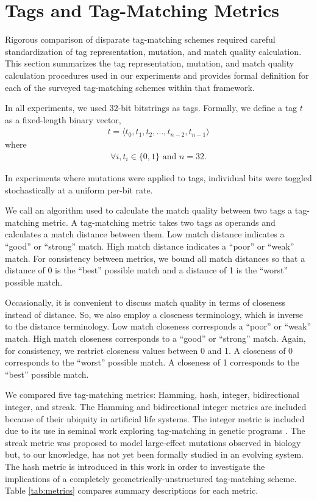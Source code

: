 \section{Tags and Tag-Matching Metrics}

Rigorous comparison of disparate tag-matching schemes required careful standardization of tag representation, mutation, and match quality calculation.
This section summarizes the tag representation, mutation, and match quality calculation procedures used in our experiments and provides formal definition for each of the surveyed tag-matching schemes within that framework.

In all experiments, we used 32-bit bitstrings as tags.
Formally, we define a tag $t$ as a fixed-length binary vector,
\begin{align*}
t = \langle t_0, t_1, t_2, \dots, t_{n-2}, t_{n-1} \rangle
\end{align*}
where
\begin{align*}
\forall i, t_i \in \{0, 1\} \text{ and } n=32.
\end{align*}

In experiments where mutations were applied to tags, individual bits were toggled stochastically at a uniform per-bit rate.

We call an algorithm used to calculate the match quality between two tags a tag-matching metric.
A tag-matching metric takes two tags as operands and calculates a match distance between them.
Low match distance indicates a ``good'' or ``strong'' match.
High match distance indicates a ``poor'' or ``weak'' match.
For consistency between metrics, we bound all match distances so that a distance of 0 is the ``best'' possible match and a distance of 1 is the ``worst'' possible match.

Occasionally, it is convenient to discuss match quality in terms of closeness instead of distance.
So, we also employ a closeness terminology, which is inverse to the distance terminology.
Low match closeness corresponds a ``poor'' or ``weak'' match.
High match closeness corresponds to a ``good'' or ``strong'' match.
Again, for consistency, we restrict closeness values between 0 and 1.
A closeness of 0 corresponds to the ``worst'' possible match.
A closeness of 1 corresponds to the ``best'' possible match.



We compared five tag-matching metrics: Hamming, hash, integer, bidirectional integer, and streak.
The Hamming and bidirectional integer metrics are included because of their ubiquity in artificial life systems.
The integer metric is included due to its use in seminal work exploring tag-matching in genetic programs \citep{spector2011tag, spector2011s,spector2012tag}.
The streak metric was proposed to model large-effect mutations observed in biology but, to our knowledge, has not yet been formally studied in an evolving system.
The hash metric is introduced in this work in order to investigate the implications of a completely geometrically-unstructured tag-matching scheme.
Table \ref{tab:metrics} compares summary descriptions for each metric.

